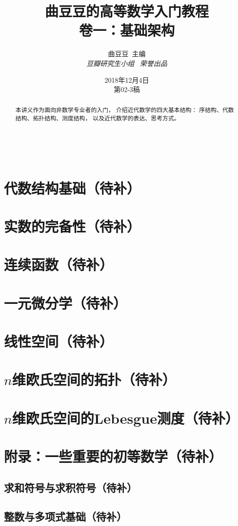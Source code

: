 \documentclass[a4paper, 11pt]{article} %
\title{\textbf{曲豆豆的高等数学入门教程}\\$\,$\\%
卷一：基础架构} %
\author{\textsc{曲豆豆\,\,\,主编} %
\\{\textit{豆瓣研究生小组\,\,\,\,\,荣誉出品}}} %
\date{2018年12月4日\\
第02-3稿} %
\makeatletter
\renewcommand{\maketitle}{ %
\begin{center} %
{\Huge\@title} %

\vspace{50pt} %

{\Large\@author} %
\\\@date %

\vspace{20pt} %
\end{center}
}
\makeatother
\begin{document}
\maketitle


\begin{abstract}
本讲义作为面向非数学专业者的入门，
介绍近代数学的四大基本结构：
序结构、代数结构、拓扑结构、测度结构，
以及近代数学的表达、思考方式。
\end{abstract}

\tableofcontents
\newpage

\newpage




\section{代数结构基础（待补）}
\section{实数的完备性（待补）}
\section{连续函数（待补）}
\section{一元微分学（待补）}
\section{线性空间（待补）}
\section{$n$维欧氏空间的拓扑（待补）}
\section{$n$维欧氏空间的Lebesgue测度（待补）}
\section{附录：一些重要的初等数学（待补）}
\subsection{求和符号与求积符号（待补）}
\subsection{整数与多项式基础（待补）}
\end{document}
